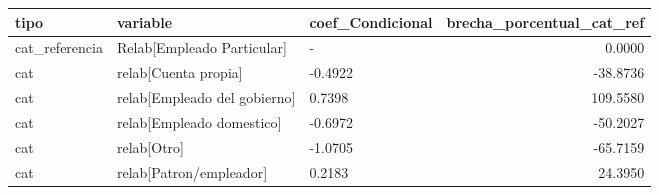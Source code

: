 \begin{tabular}{lllr}
\toprule
tipo & variable & coef\_Condicional & brecha\_porcentual\_cat\_ref \\
\midrule
cat\_referencia & Relab[Empleado Particular] & - & 0.0000 \\
cat & relab[Cuenta propia] & -0.4922 & -38.8736 \\
cat & relab[Empleado del gobierno] & 0.7398 & 109.5580 \\
cat & relab[Empleado domestico] & -0.6972 & -50.2027 \\
cat & relab[Otro] & -1.0705 & -65.7159 \\
cat & relab[Patron/empleador] & 0.2183 & 24.3950 \\
\bottomrule
\end{tabular}
